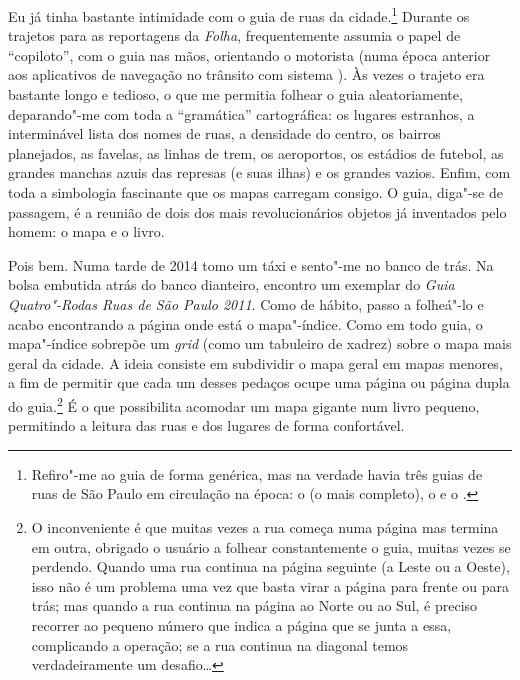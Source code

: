 Eu já tinha bastante intimidade com o guia de ruas da cidade.\footnote{Refiro"-me
  ao guia de forma genérica, mas na verdade havia três guias de ruas de
  São Paulo em circulação na época: o {} (o mais completo),
  o {} e o {}.} Durante os
trajetos para as reportagens da \emph{Folha}, frequentemente assumia o
papel de ``copiloto'', com o guia nas mãos, orientando o motorista (numa
época anterior aos aplicativos de navegação no trânsito com sistema
). Às vezes o trajeto era bastante longo e tedioso, o que me permitia
folhear o guia aleatoriamente, deparando"-me com toda a ``gramática''
cartográfica: os lugares estranhos, a interminável lista dos nomes de
ruas, a densidade do centro, os bairros planejados, as favelas, as
linhas de trem, os aeroportos, os estádios de futebol, as grandes
manchas azuis das represas (e suas ilhas) e os grandes vazios. Enfim,
com toda a simbologia fascinante que os mapas carregam consigo. O guia,
diga"-se de passagem, é a reunião de dois dos mais revolucionários
objetos já inventados pelo homem: o mapa e o livro.

Pois bem. Numa tarde de 2014 tomo um táxi e sento"-me no banco de trás.
Na bolsa embutida atrás do banco dianteiro, encontro um exemplar do
\emph{Guia Quatro"-Rodas Ruas de São Paulo 2011}. Como de hábito, passo a
folheá"-lo e acabo encontrando a página onde está o mapa"-índice. Como em
todo guia, o mapa"-índice sobrepõe um \emph{grid} (como um tabuleiro de
xadrez) sobre o mapa mais geral da cidade. A ideia consiste em
subdividir o mapa geral em mapas menores, a fim de permitir que cada um
desses pedaços ocupe uma página ou página dupla do guia.\footnote{O
  inconveniente é que muitas vezes a rua começa numa página mas termina
  em outra, obrigado o usuário a folhear constantemente o guia, muitas
  vezes se perdendo. Quando uma rua continua na página seguinte (a Leste
  ou a Oeste), isso não é um problema uma vez que basta virar a página
  para frente ou para trás; mas quando a rua continua na página ao Norte
  ou ao Sul, é preciso recorrer ao pequeno número que indica a página
  que se junta a essa, complicando a operação; se a rua continua na
  diagonal temos verdadeiramente um desafio\ldots{}} É o que possibilita
acomodar um mapa gigante num livro pequeno, permitindo a leitura das
ruas e dos lugares de forma confortável.

